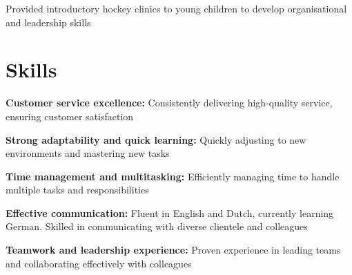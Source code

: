	\vspace{0.10 cm}
	\begin{onecolentry}
		\begin{highlights}
			\item Provided introductory hockey clinics to young children to develop organisational and leadership skills
		\end{highlights}
	\end{onecolentry}

	\section{Skills}
	
	\begin{onecolentry}
			\textbf{Customer service excellence:} Consistently delivering high-quality service, ensuring customer satisfaction
		\end{onecolentry}
	
	\vspace{0.2 cm}
	
	\begin{onecolentry}
			\textbf{Strong adaptability and quick learning:} Quickly adjusting to new environments and mastering new tasks
		\end{onecolentry}
	
	\vspace{0.2 cm}
	
	\begin{onecolentry}
		\textbf{Time management and multitasking:} Efficiently managing time to handle multiple tasks and responsibilities
	\end{onecolentry}
	
	\vspace{0.2 cm}
	
	\begin{onecolentry}
		\textbf{Effective communication:} Fluent in English and Dutch, currently learning German. Skilled in communicating with diverse clientele and colleagues
	\end{onecolentry}
	
	\vspace{0.2 cm}
	
	\begin{onecolentry}
		\textbf{Teamwork and leadership experience:} Proven experience in leading teams and collaborating effectively with colleagues
	\end{onecolentry}
	
	\vspace{0.2 cm}
	
